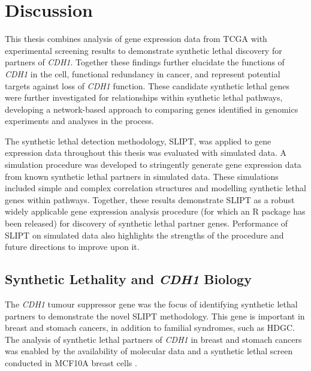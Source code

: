 \chapter{Discussion}
\label{chap:discussion}

This thesis combines analysis of \gls{gene expression} data from \gls{TCGA} with experimental screening results \citep{Telford2015} to demonstrate \gls{synthetic lethal} discovery for partners of \textit{CDH1}. %
Together these findings further elucidate the functions of \textit{CDH1} in the cell, \gls{functional redundancy} in cancer, and represent potential targets against loss of \textit{CDH1} function. These candidate \gls{synthetic lethal} genes were further investigated for relationships within \gls{synthetic lethal} pathways, developing a network-based approach to comparing genes identified in \glspl{genomic} experiments and analyses in the process.

The \gls{synthetic lethal} detection methodology, \gls{SLIPT}, was applied to \gls{gene expression} data throughout this thesis was evaluated with simulated data. A simulation procedure was developed to stringently generate \gls{gene expression} data from known \gls{synthetic lethal} partners in simulated data. These simulations included simple and complex correlation structures and modelling \gls{synthetic lethal} genes within pathways. Together, these results demonstrate \gls{SLIPT} as a robust widely applicable \gls{gene expression} analysis procedure (for which an R package has been released) for discovery of \gls{synthetic lethal} partner genes. Performance of \gls{SLIPT} on simulated data also highlights the strengths of the procedure and future directions to improve upon it.

\section{Synthetic Lethality and \textit{CDH1} Biology}
\label{chapt6:implications}

The \textit{CDH1} \gls{tumour suppressor} gene was the focus of identifying \gls{synthetic lethal} partners to demonstrate the novel \gls{SLIPT} methodology. This gene is important in  breast and stomach cancers, in addition to \gls{familial} syndromes, such as \gls{HDGC}. The analysis of \gls{synthetic lethal} partners of \textit{CDH1} in breast and stomach cancers was enabled by the availability of molecular data \citep{TCGA2012, TCGA2014GC} and a \gls{synthetic lethal} screen conducted in \gls{MCF10A} breast cells \citep{Chen2014, Telford2015}.

